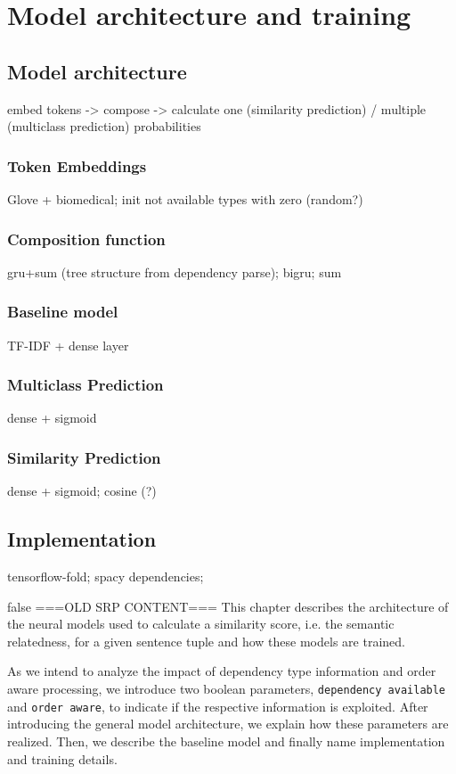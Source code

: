 \section{Model architecture and training}

\subsection{Model architecture}

embed tokens -> compose -> calculate one (similarity prediction) / multiple (multiclass prediction) probabilities

\subsubsection{Token Embeddings}
Glove + biomedical; init not available types with zero (random?)

\subsubsection{Composition function}
gru+sum (tree structure from dependency parse); bigru; sum

\subsubsection{Baseline model}
TF-IDF + dense layer

\subsubsection{Multiclass Prediction}
dense + sigmoid

\subsubsection{Similarity Prediction}
dense + sigmoid; cosine (?)

\subsection{Implementation}
tensorflow-fold; spacy dependencies; 

\if false
===OLD SRP CONTENT===
This chapter describes the architecture of the neural models used to calculate a similarity score, i.e. the semantic relatedness, for a given sentence tuple and how these models are trained. 

As we intend to analyze the impact of dependency type information and order aware processing, we introduce two boolean parameters, \texttt{dependency available} and \texttt{order aware}, to indicate if the respective information is exploited. After introducing the general model architecture, we explain how these parameters are realized. Then, we describe the baseline model and finally name implementation and training details.


